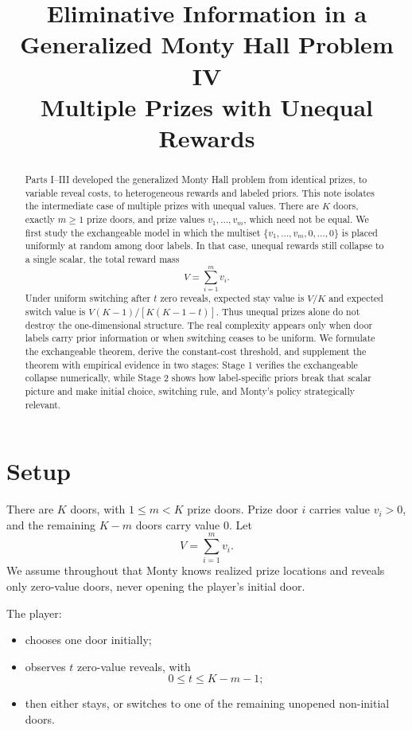 \documentclass[11pt]{article}
\title{\textbf{Eliminative Information in a Generalized Monty Hall Problem IV}\\
\large Multiple Prizes with Unequal Rewards}
\author{}
\date{}
\begin{document}
\maketitle

\begin{abstract}
Parts I--III developed the generalized Monty Hall problem from identical prizes,
to variable reveal costs, to heterogeneous rewards and labeled priors. This
note isolates the intermediate case of multiple prizes with unequal values.
There are $K$ doors, exactly $m\ge1$ prize doors, and prize values
$v_1,\dots,v_m$, which need not be equal. We first study the exchangeable
model in which the multiset $\{v_1,\dots,v_m,0,\dots,0\}$ is placed uniformly
at random among door labels. In that case, unequal rewards still collapse to a
single scalar, the total reward mass
\[
  V=\sum_{i=1}^m v_i.
\]
Under uniform switching after $t$ zero reveals, expected stay value is $V/K$
and expected switch value is $V(K-1)/[K(K-1-t)]$. Thus unequal prizes alone do
not destroy the one-dimensional structure. The real complexity appears only
when door labels carry prior information or when switching ceases to be
uniform. We formulate the exchangeable theorem, derive the constant-cost
threshold, and supplement the theorem with empirical evidence in two stages:
Stage 1 verifies the exchangeable collapse numerically, while Stage 2 shows how
label-specific priors break that scalar picture and make initial choice,
switching rule, and Monty's policy strategically relevant.
\end{abstract}

\section{Setup}

There are $K$ doors, with $1\le m<K$ prize doors. Prize door $i$ carries value
$v_i>0$, and the remaining $K-m$ doors carry value $0$. Let
\[
  V=\sum_{i=1}^m v_i.
\]
We assume throughout that Monty knows realized prize locations and reveals only
zero-value doors, never opening the player's initial door.

The player:
\begin{itemize}
\item chooses one door initially;
\item observes $t$ zero-value reveals, with
\[
  0\le t\le K-m-1;
\]
\item then either stays, or switches to one of the remaining unopened
non-initial doors.
\end{itemize}
\end{document}
